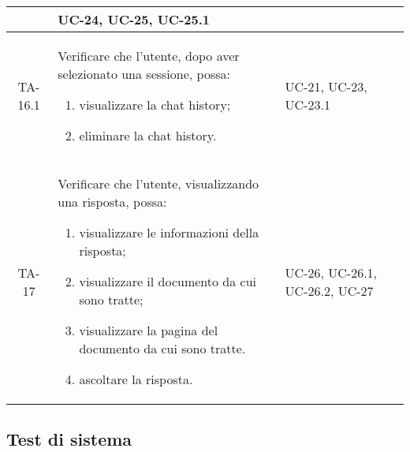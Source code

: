\begin{xltabular}{\textwidth}{| c | X | X | c |}
\begin{enumerate}
    \end{enumerate}& UC-24, UC-25, UC-25.1 &  \\
    \hline
    TA-16.1 & Verificare che l'utente, dopo aver selezionato una sessione, possa:
    \begin{enumerate}
        \item visualizzare la chat history;
        \item eliminare la chat history.
        
    \end{enumerate}& UC-21, UC-23, UC-23.1 &  \\
    \hline

     TA-17 & Verificare che l'utente, visualizzando una risposta, possa:
    \begin{enumerate}
        \item visualizzare le informazioni della risposta;
        \item visualizzare il documento da cui sono tratte;
        \item visualizzare la pagina del documento da cui sono tratte.
        \item ascoltare la risposta.
        
    \end{enumerate}& UC-26, UC-26.1, UC-26.2, UC-27 &  \\
    \hline

    
    
\end{xltabular}
\endgroup


\subsection{Test di sistema}

